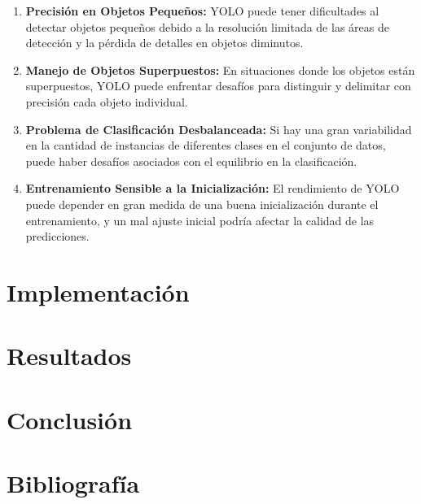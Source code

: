 	\begin{enumerate}
		\item \textbf{Precisión en Objetos Pequeños:} YOLO puede tener dificultades al detectar objetos pequeños debido a la resolución limitada de las áreas de detección y la pérdida de detalles en objetos diminutos.
    
    	\item \textbf{Manejo de Objetos Superpuestos:} En situaciones donde los objetos están superpuestos, YOLO puede enfrentar desafíos para distinguir y delimitar con precisión cada objeto individual.
    
   	 	\item \textbf{Problema de Clasificación Desbalanceada:} Si hay una gran variabilidad en la cantidad de instancias de diferentes clases en el conjunto de datos, puede haber desafíos asociados con el equilibrio en la clasificación.
    
    	\item \textbf{Entrenamiento Sensible a la Inicialización:} El rendimiento de YOLO puede depender en gran medida de una buena inicialización durante el entrenamiento, y un mal ajuste inicial podría afectar la calidad de las predicciones.	
	
	\end{enumerate}
	
	


	


	

\section{Implementación}
\section{Resultados}
\section{Conclusión}
\section{Bibliografía}
